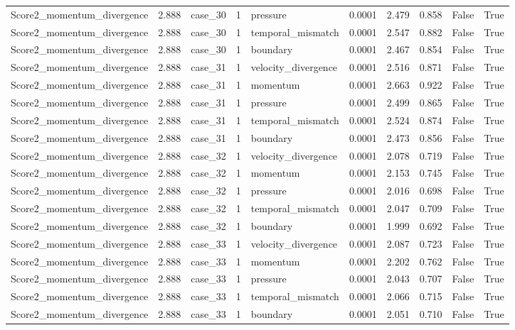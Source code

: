 \begin{longtable}{llllllllll}
Score2\_momentum\_divergence & 2.888 & case\_30 & 1 & pressure & 0.0001 & 2.479 & 0.858 & False & True \\
Score2\_momentum\_divergence & 2.888 & case\_30 & 1 & temporal\_mismatch & 0.0001 & 2.547 & 0.882 & False & True \\
Score2\_momentum\_divergence & 2.888 & case\_30 & 1 & boundary & 0.0001 & 2.467 & 0.854 & False & True \\
Score2\_momentum\_divergence & 2.888 & case\_31 & 1 & velocity\_divergence & 0.0001 & 2.516 & 0.871 & False & True \\
Score2\_momentum\_divergence & 2.888 & case\_31 & 1 & momentum & 0.0001 & 2.663 & 0.922 & False & True \\
Score2\_momentum\_divergence & 2.888 & case\_31 & 1 & pressure & 0.0001 & 2.499 & 0.865 & False & True \\
Score2\_momentum\_divergence & 2.888 & case\_31 & 1 & temporal\_mismatch & 0.0001 & 2.524 & 0.874 & False & True \\
Score2\_momentum\_divergence & 2.888 & case\_31 & 1 & boundary & 0.0001 & 2.473 & 0.856 & False & True \\
Score2\_momentum\_divergence & 2.888 & case\_32 & 1 & velocity\_divergence & 0.0001 & 2.078 & 0.719 & False & True \\
Score2\_momentum\_divergence & 2.888 & case\_32 & 1 & momentum & 0.0001 & 2.153 & 0.745 & False & True \\
Score2\_momentum\_divergence & 2.888 & case\_32 & 1 & pressure & 0.0001 & 2.016 & 0.698 & False & True \\
Score2\_momentum\_divergence & 2.888 & case\_32 & 1 & temporal\_mismatch & 0.0001 & 2.047 & 0.709 & False & True \\
Score2\_momentum\_divergence & 2.888 & case\_32 & 1 & boundary & 0.0001 & 1.999 & 0.692 & False & True \\
Score2\_momentum\_divergence & 2.888 & case\_33 & 1 & velocity\_divergence & 0.0001 & 2.087 & 0.723 & False & True \\
Score2\_momentum\_divergence & 2.888 & case\_33 & 1 & momentum & 0.0001 & 2.202 & 0.762 & False & True \\
Score2\_momentum\_divergence & 2.888 & case\_33 & 1 & pressure & 0.0001 & 2.043 & 0.707 & False & True \\
Score2\_momentum\_divergence & 2.888 & case\_33 & 1 & temporal\_mismatch & 0.0001 & 2.066 & 0.715 & False & True \\
Score2\_momentum\_divergence & 2.888 & case\_33 & 1 & boundary & 0.0001 & 2.051 & 0.710 & False & True \\

\end{longtable}
